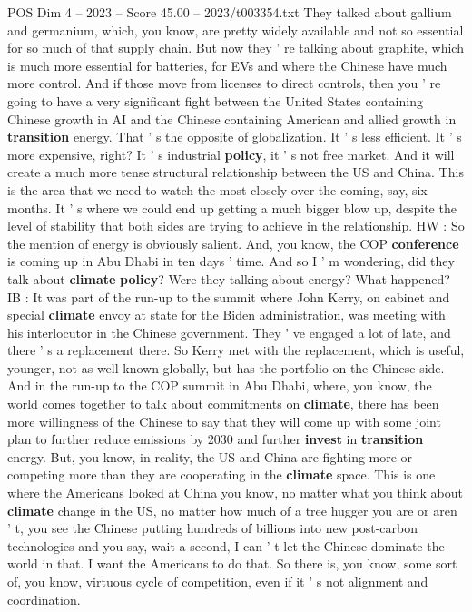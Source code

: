 \begin{textsample}{POS Dim 4 – 2023 – Score 45.00 – 2023/t003354.txt}
They talked about gallium and germanium, which, you know, are pretty widely available and not so essential for so much of that supply chain.
But now they ' re talking about graphite, which is much more essential for batteries, for EVs and where the Chinese have much more control.
And if those move from licenses to direct controls, then you ' re going to have a very significant fight between the United States containing Chinese growth in AI and the Chinese containing American and allied growth in \textbf{transition} energy.
That ' s the opposite of globalization.
It ' s less efficient.
It ' s more expensive, right?
It ' s industrial \textbf{policy}, it ' s not free market.
And it will create a much more tense structural relationship between the US and China.
This is the area that we need to watch the most closely over the coming, say, six months.
It ' s where we could end up getting a much bigger blow up, despite the level of stability that both sides are trying to achieve in the relationship.
HW : So the mention of energy is obviously salient.
And, you know, the COP \textbf{conference} is coming up in Abu Dhabi in ten days ' time.
And so I ' m wondering, did they talk about \textbf{climate} \textbf{policy}?
Were they talking about energy?
What happened?
IB : It was part of the run-up to the summit where John Kerry, on cabinet and special \textbf{climate} envoy at state for the Biden administration, was meeting with his interlocutor in the Chinese government.
They ' ve engaged a lot of late, and there ' s a replacement there.
So Kerry met with the replacement, which is useful, younger, not as well-known globally, but has the portfolio on the Chinese side.
And in the run-up to the COP summit in Abu Dhabi, where, you know, the world comes together to talk about commitments on \textbf{climate}, there has been more willingness of the Chinese to say that they will come up with some joint plan to further reduce emissions by 2030 and further \textbf{invest} in \textbf{transition} energy.
But, you know, in reality, the US and China are fighting more or competing more than they are cooperating in the \textbf{climate} space.
This is one where the Americans looked at China you know, no matter what you think about \textbf{climate} change in the US, no matter how much of a tree hugger you are or aren ' t, you see the Chinese putting hundreds of billions into new post-carbon technologies and you say, wait a second, I can ' t let the Chinese dominate the world in that.
I want the Americans to do that.
So there is, you know, some sort of, you know, virtuous cycle of competition, even if it ' s not alignment and coordination.

\end{textsample}
